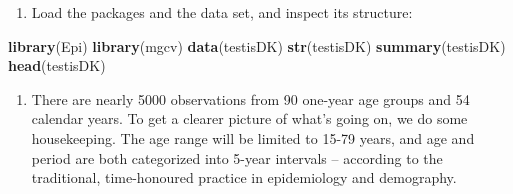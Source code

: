 \documentclass[
]{book}
\newenvironment{Shaded}{\begin{snugshade}}{\end{snugshade}}
\newcommand{\AttributeTok}[1]{\textcolor[rgb]{0.13,0.29,0.53}{#1}}
\newcommand{\ConstantTok}[1]{\textcolor[rgb]{0.56,0.35,0.01}{#1}}
\newcommand{\DecValTok}[1]{\textcolor[rgb]{0.00,0.00,0.81}{#1}}
\newcommand{\FunctionTok}[1]{\textcolor[rgb]{0.13,0.29,0.53}{\textbf{#1}}}
\newcommand{\NormalTok}[1]{#1}
\newcommand{\OtherTok}[1]{\textcolor[rgb]{0.56,0.35,0.01}{#1}}
\newcommand{\SpecialCharTok}[1]{\textcolor[rgb]{0.81,0.36,0.00}{\textbf{#1}}}
\providecommand{\tightlist}{%
  \setlength{\itemsep}{0pt}\setlength{\parskip}{0pt}}
\begin{document}
\begin{enumerate}
\def\labelenumi{\arabic{enumi}.}
\tightlist
\item
  Load the packages and the data set, and inspect its structure:
\end{enumerate}

\begin{Shaded}
\begin{Highlighting}[]
\FunctionTok{library}\NormalTok{(Epi)}
\FunctionTok{library}\NormalTok{(mgcv)}
\FunctionTok{data}\NormalTok{(testisDK)}
\FunctionTok{str}\NormalTok{(testisDK)}
\FunctionTok{summary}\NormalTok{(testisDK)}
\FunctionTok{head}\NormalTok{(testisDK)}
\end{Highlighting}
\end{Shaded}

\begin{enumerate}
\def\labelenumi{\arabic{enumi}.}
\setcounter{enumi}{1}
\tightlist
\item
  There are nearly 5000 observations from 90 one-year age groups and
  54 calendar years. To get a clearer picture of what's going on, we
  do some housekeeping. The age range will be limited to 15-79 years,
  and age and period are both categorized into 5-year intervals --
  according to the traditional, time-honoured practice in epidemiology
  and demography.
\end{enumerate}

\begin{Shaded}
\end{Shaded}
\end{document}
